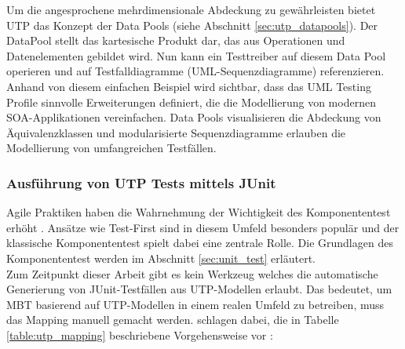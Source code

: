 Um die angesprochene mehrdimensionale Abdeckung zu gewährleisten bietet \Gls{UTP} das Konzept der Data Pools (siehe Abschnitt \ref{sec:utp_datapools}). Der DataPool stellt das kartesische Produkt dar, das aus Operationen und Datenelementen gebildet wird. Nun kann ein Testtreiber auf diesem Data Pool operieren und auf Testfalldiagramme (UML-Sequenzdiagramme) referenzieren.\\
Anhand von diesem einfachen Beispiel wird sichtbar, dass das \Gls{UML} Testing Profile sinnvolle Erweiterungen definiert, die die Modellierung von modernen SOA-Applikationen vereinfachen. Data Pools visualisieren die Abdeckung von Äquivalenzklassen und modularisierte Sequenzdiagramme erlauben die Modellierung von umfangreichen Testfällen. 

\subsubsection{Ausführung von UTP Tests mittels JUnit}
Agile Praktiken haben die Wahrnehmung der Wichtigkeit des Komponententest erhöht \cite{_model-driven_2007}. Ansätze wie \gls{Test-First} sind in diesem Umfeld besonders populär und der klassische Komponententest spielt dabei eine zentrale Rolle. Die Grundlagen des Komponententest werden im Abschnitt \ref{sec:unit_test} erläutert.\\

Zum Zeitpunkt dieser Arbeit gibt es kein Werkzeug welches die automatische Generierung von JUnit-Testfällen aus \Gls{UTP}-Modellen erlaubt. Das bedeutet, um \Gls{MBT} basierend auf \Gls{UTP}-Modellen in einem realen Umfeld zu betreiben, muss das Mapping manuell gemacht werden. \citeauthor{_model-driven_2007} schlagen dabei, die in Tabelle \ref{table:utp_mapping} beschriebene Vorgehensweise vor \cite{_model-driven_2007}:

